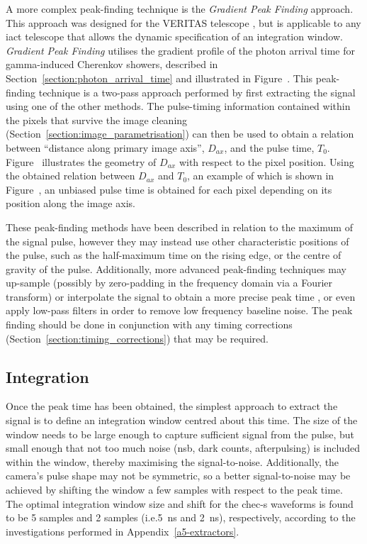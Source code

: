  A more complex peak-finding technique is the \textit{Gradient Peak Finding} approach. This approach was designed for the VERITAS telescope \cite{Holder2005}\cite{Cogan2006}\cite{Cogan2007}, but is applicable to any \gls{iact} telescope that allows the dynamic specification of an integration window. \textit{Gradient Peak Finding} utilises the gradient profile of the photon arrival time for gamma-induced Cherenkov showers, described in Section~\ref{section:photon_arrival_time} and illustrated in Figure~. This peak-finding technique is a two-pass approach performed by first extracting the signal using one of the other methods. The pulse-timing information contained within the pixels that survive the image cleaning (Section~\ref{section:image_parametrisation}) can then be used to obtain a relation between ``distance along primary image axis'', $D_{ax}$, and the pulse time, $T_0$. Figure~ illustrates the geometry of $D_{ax}$ with respect to the pixel position. Using the obtained relation between $D_{ax}$ and $T_0$, an example of which is shown in Figure~, an unbiased pulse time is obtained for each pixel depending on its position along the image axis.

These peak-finding methods have been described in relation to the maximum of the signal pulse, however they may instead use other characteristic positions of the pulse, such as the half-maximum time on the rising edge, or the centre of gravity of the pulse. Additionally, more advanced peak-finding techniques may up-sample (possibly by zero-padding in the frequency domain via a Fourier transform) or interpolate the signal to obtain a more precise peak time \cite{Cogan2006, Cogan2007}, or even apply low-pass filters in order to remove low frequency baseline noise. The peak finding should be done in conjunction with any timing corrections (Section~\ref{section:timing_corrections}) that may be required.

\subsection{Integration}

Once the peak time has been obtained, the simplest approach to extract the signal is to define an integration window centred about this time. The size of the window needs to be large enough to capture sufficient signal from the pulse, but small enough that not too much noise (\gls{nsb}, dark counts, afterpulsing) is included within the window, thereby maximising the signal-to-noise. Additionally, the camera's pulse shape may not be symmetric, so a better signal-to-noise may be achieved by shifting the window a few samples with respect to the peak time. The optimal integration window size and shift for the \gls{chec-s} waveforms is found to be 5 samples and 2 samples (i.e.\@ \SI{5}{ns} and \SI{2}{ns}), respectively, according to the investigations performed in Appendix~\ref{a5-extractors}.

